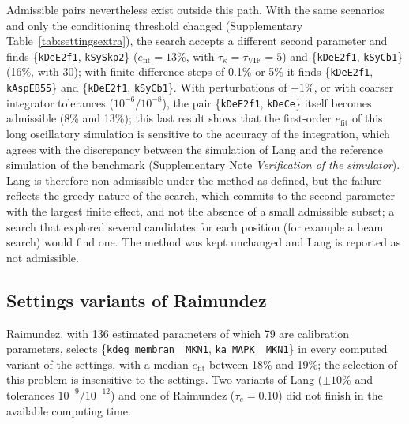 Admissible pairs nevertheless exist outside this path. With the same scenarios and only the conditioning threshold changed (Supplementary Table~\ref{tab:settingsextra}), the search accepts a different second parameter and finds \{\texttt{kDeE2f1}, \texttt{kSySkp2}\} ($e_{\mathrm{fit}}=13\%$, with $\tau_\kappa=\tau_{\mathrm{VIF}}=5$) and \{\texttt{kDeE2f1}, \texttt{kSyCb1}\} (16\%, with 30); with finite-difference steps of 0.1\% or 5\% it finds \{\texttt{kDeE2f1}, \texttt{kAspEB55}\} and \{\texttt{kDeE2f1}, \texttt{kSyCb1}\}. With perturbations of $\pm1\%$, or with coarser integrator tolerances ($10^{-6}/10^{-8}$), the pair \{\texttt{kDeE2f1}, \texttt{kDeCe}\} itself becomes admissible (8\% and 13\%); this last result shows that the first-order $e_{\mathrm{fit}}$ of this long oscillatory simulation is sensitive to the accuracy of the integration, which agrees with the discrepancy between the simulation of Lang and the reference simulation of the benchmark (Supplementary Note \emph{Verification of the simulator}). Lang is therefore non-admissible under the method as defined, but the failure reflects the greedy nature of the search, which commits to the second parameter with the largest finite effect, and not the absence of a small admissible subset; a search that explored several candidates for each position (for example a beam search) would find one. The method was kept unchanged and Lang is reported as not admissible.

\subsection*{Settings variants of Raimundez}
Raimundez, with 136 estimated parameters of which 79 are calibration parameters, selects \{\texttt{kdeg\_membran\_\_MKN1}, \texttt{ka\_MAPK\_\_MKN1}\} in every computed variant of the settings, with a median $e_{\mathrm{fit}}$ between 18\% and 19\%; the selection of this problem is insensitive to the settings. Two variants of Lang ($\pm10\%$ and tolerances $10^{-9}/10^{-12}$) and one of Raimundez ($\tau_e=0.10$) did not finish in the available computing time.

{\small

}
